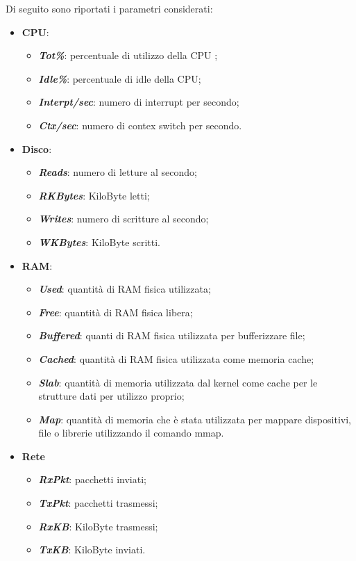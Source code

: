 Di seguito sono riportati i parametri considerati:
\begin{itemize}
  \item \textbf{CPU}:
  \begin{itemize}
    \item \textbf{\textit{Tot\%}}: percentuale di utilizzo della CPU ;
    \item \textbf{\textit{Idle\%}}: percentuale di idle della CPU;
    \item \textbf{\textit{Interpt/sec}}: numero di interrupt per secondo;
    \item \textbf{\textit{Ctx/sec}}: numero di contex switch per secondo.
  \end{itemize}
  \item \textbf{Disco}:
  \begin{itemize}
    \item \textbf{\textit{Reads}}: numero di letture al secondo;
    \item \textbf{\textit{RKBytes}}: KiloByte letti;
    \item \textbf{\textit{Writes}}: numero di scritture al secondo;
    \item \textbf{\textit{WKBytes}}: KiloByte scritti.
  \end{itemize}
  \item \textbf{RAM}:
  \begin{itemize}
    \item \textbf{\textit{Used}}: quantità di RAM fisica utilizzata;
    \item \textbf{\textit{Free}}: quantità di RAM fisica libera;
    \item \textbf{\textit{Buffered}}: quanti di RAM fisica utilizzata
   per bufferizzare file;
    \item \textbf{\textit{Cached}}: quantità di RAM fisica utilizzata come memoria cache;
    \item \textbf{\textit{Slab}}: quantità di memoria utilizzata dal kernel come cache per
    le strutture dati per utilizzo proprio;
    \item \textbf{\textit{Map}}: quantità di memoria che è stata utilizzata
   per mappare dispositivi, file o librerie utilizzando il comando mmap.
  \end{itemize}
  \item \textbf{Rete}
  \begin{itemize}
    \item \textbf{\textit{RxPkt}}: pacchetti inviati;
    \item \textbf{\textit{TxPkt}}: pacchetti trasmessi;
    \item \textbf{\textit{RxKB}}: KiloByte trasmessi;
    \item \textbf{\textit{TxKB}}: KiloByte inviati.
  \end{itemize}
\end{itemize}

